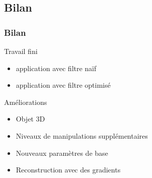 \documentclass[compress]{beamer}
\begin{document}
\subsection*{Bilan}
\begin{frame}\frametitle{Bilan}
	\begin{block}{Travail fini}
		\begin{itemize}
			\item application avec filtre na\"if
			\item application avec filtre optimisé
		\end{itemize}
	\end{block}
	\begin{block}{Améliorations}
		\begin{itemize}
			\item Objet 3D
			\item Niveaux de manipulations supplémentaires
			\item Nouveaux paramètres de base
			\item Reconstruction avec des gradients
		\end{itemize}
	\end{block}
\end{frame}
\end{document}
